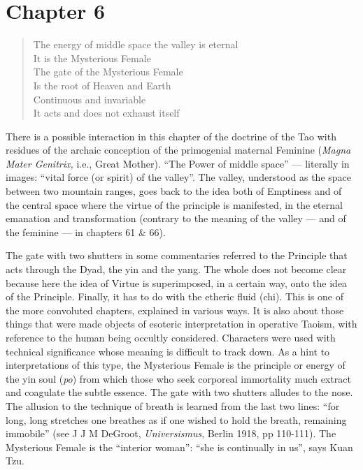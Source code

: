 \section{Chapter 6}

\begin{quotex}
\begin{verse}
The energy of middle space the valley is eternal\\
It is the Mysterious Female\\
The gate of the Mysterious Female\\
Is the root of Heaven and Earth\\
Continuous and invariable\\
It acts and does not exhaust itself
\end{verse}
\end{quotex}


There is a possible interaction in this chapter of the doctrine of the Tao with residues of the archaic conception of the primogenial maternal Feminine (\emph{Magna Mater Genitrix,} i.e., Great Mother). ``The Power of middle space'' --- literally in images: ``vital force (or spirit) of the valley''. The valley, understood as the space between two mountain ranges, goes back to the idea both of Emptiness and of the central space where the virtue of the principle is manifested, in the eternal emanation and transformation (contrary to the meaning of the valley --- and of the feminine --- in chapters 61 \& 66).

The gate with two shutters in some commentaries referred to the Principle that acts through the Dyad, the yin and the yang. The whole does not become clear because here the idea of Virtue is superimposed, in a certain way, onto the idea of the Principle. Finally, it has to do with the etheric fluid (chi). This is one of the more convoluted chapters, explained in various ways. It is also about those things that were made objects of esoteric interpretation in operative Taoism, with reference to the human being occultly considered. Characters were used with technical significance whose meaning is difficult to track down. As a hint to interpretations of this type, the Mysterious Female is the principle or energy of the yin soul (\emph{po}) from which those who seek corporeal immortality much extract and coagulate the subtle essence. The gate with two shutters alludes to the nose. The allusion to the technique of breath is learned from the last two lines: ``for long, long stretches one breathes as if one wished to hold the breath, remaining immobile'' (see J J M DeGroot, \emph{Universismus}, Berlin 1918, pp 110-111). The Mysterious Female is the ``interior woman'': ``she is continually in us'', says Kuan Tzu.

